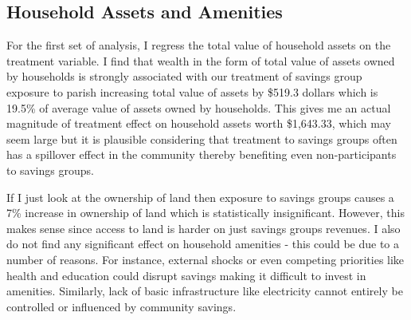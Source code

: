 \documentclass[12pt]{article}
\begin{document}
{\subsection*{Household Assets and Amenities}\label{sec:assets amenities}

\hspace{1cm} For the first set of analysis, I regress the total value of household assets on the treatment variable. I find that wealth in the form of total value of assets owned by households is strongly associated with our treatment of savings group exposure to parish increasing total value of assets by \$519.3 dollars which is 19.5\% of average value of assets owned by households. This gives me an actual magnitude of treatment effect on household assets worth \$1,643.33, which may seem large but it is plausible considering that treatment to savings groups often has a spillover effect in the community thereby benefiting even non-participants to savings groups. 

\hspace{1cm} If I just look at the ownership of land then exposure to savings groups causes a 7\% increase in ownership of land which is statistically insignificant. However, this makes sense since access to land is harder on just savings groups revenues. I also do not find any significant effect on household amenities - this could be due to a number of reasons. For instance, external shocks or even competing priorities like health and education could disrupt savings making it difficult to invest in amenities. Similarly, lack of basic infrastructure like electricity cannot entirely be controlled or influenced by community savings.

}
\end{document}
